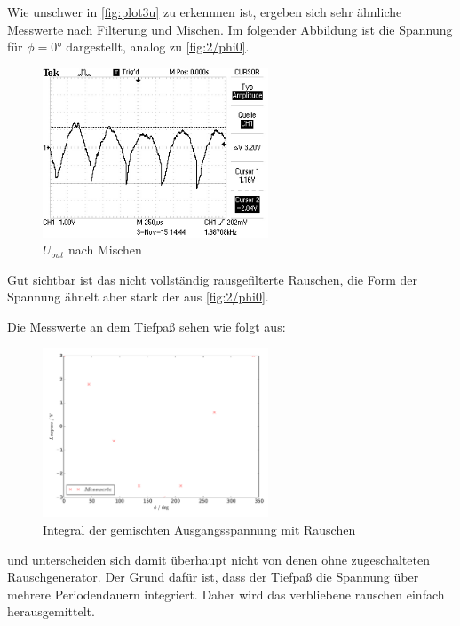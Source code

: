 Wie unschwer in \ref{fig:plot3u} zu erkennnen ist, ergeben sich sehr ähnliche
Messwerte nach Filterung und Mischen. Im folgender Abbildung ist die
Spannung für $\phi=0°$ dargestellt, analog zu \ref{fig:2/phi0}.

\begin{figure}
  \centering
  \includegraphics[keepaspectratio, angle=90,width=0.6\textwidth]{graphics/ALL0039/F0039TEK.jpg}
  \caption{$U_{out}$ nach Mischen}
  \label{fig:3/phi0}
\end{figure}

Gut sichtbar ist das nicht vollständig rausgefilterte Rauschen, die Form der
Spannung ähnelt aber stark der aus \ref{fig:2/phi0}.

Die Messwerte an dem Tiefpaß sehen wie folgt aus:

\begin{figure}
  \centering
  \includegraphics[keepaspectratio,width=0.6\textwidth]{plot3low.pdf}
  \caption{Integral der gemischten Ausgangsspannung mit Rauschen}
  \label{fig:plot3low}
\end{figure}

und unterscheiden sich damit überhaupt nicht von denen ohne zugeschalteten
Rauschgenerator. Der Grund dafür ist, dass der Tiefpaß die Spannung über mehrere
Periodendauern integriert. Daher wird das verbliebene rauschen einfach
herausgemittelt.

